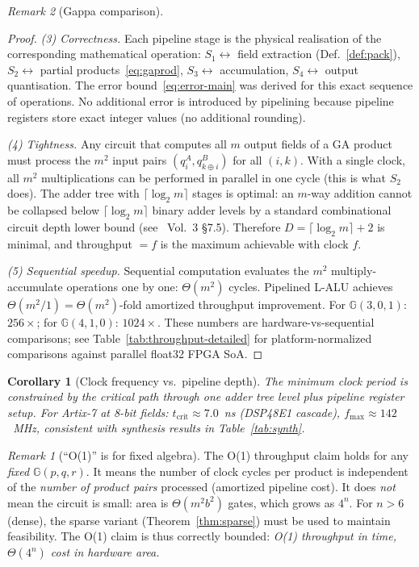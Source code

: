 \documentclass[11pt,a4paper]{article}
\theoremstyle{definition}
\theoremstyle{plain}
\newtheorem{corollary}{Corollary}[section]
\theoremstyle{remark}
\newtheorem{remark}{Remark}[section]
\newcommand{\GA}{\mathbb{G}}
\newcommand{\ceil}[1]{\lceil #1 \rceil}
\begin{document}
\begin{remark}[Gappa comparison]
\begin{proof}
\textit{(3) Correctness.}
Each pipeline stage is the physical realisation of the corresponding
mathematical operation:
$S_1 \leftrightarrow$ field extraction (Def.~\ref{def:pack}),
$S_2 \leftrightarrow$ partial products~\eqref{eq:gaprod},
$S_3 \leftrightarrow$ accumulation,
$S_4 \leftrightarrow$ output quantisation.
The error bound~\eqref{eq:error-main} was derived for this exact
sequence of operations.
No additional error is introduced by pipelining because pipeline
registers store exact integer values (no additional rounding).

\textit{(4) Tightness.}
Any circuit that computes all $m$ output fields of a GA product must
process the $m^2$ input pairs $(q_i^A, q_{k\oplus i}^B)$ for all
$(i,k)$.
With a single clock, all $m^2$ multiplications can be performed in
parallel in one cycle (this is what $S_2$ does).
The adder tree with $\ceil{\log_2 m}$ stages is optimal: an $m$-way
addition cannot be collapsed below $\ceil{\log_2 m}$ binary adder
levels by a standard combinational circuit depth lower bound
(see~\cite{knuth1998} Vol.~3 \S7.5).
Therefore $D = \ceil{\log_2 m}+2$ is minimal, and throughput $= f$
is the maximum achievable with clock $f$.

\textit{(5) Sequential speedup.}
Sequential computation evaluates the $m^2$ multiply-accumulate
operations one by one: $\Theta(m^2)$ cycles.
Pipelined L-ALU achieves $\Theta(m^2/1) = \Theta(m^2)$-fold amortized
throughput improvement.
For $\GA(3,0,1)$: $256\times$; for $\GA(4,1,0)$: $1024\times$.
These numbers are hardware-vs-sequential comparisons; see
Table~\ref{tab:throughput-detailed} for platform-normalized comparisons
against parallel float32 FPGA SoA.
\end{proof}

\begin{corollary}[Clock frequency vs.\ pipeline depth]\label{cor:fmax}
The minimum clock period is constrained by the critical path through
one adder tree level plus pipeline register setup.
For Artix-7 at 8-bit fields: $t_{\mathrm{crit}} \approx 7.0$~ns
(DSP48E1 cascade), $f_{\max} \approx 142$~MHz, consistent with
synthesis results in Table~\ref{tab:synth}.
\end{corollary}

\begin{remark}[``O(1)'' is for fixed algebra]\label{rem:o1}
The O(1) throughput claim holds for any \emph{fixed} $\GA(p,q,r)$.
It means the number of clock cycles per product is independent of the
\emph{number of product pairs} processed (amortized pipeline cost).
It does \emph{not} mean the circuit is small: area is $\Theta(m^2b^2)$
gates, which grows as $4^n$.
For $n > 6$ (dense), the sparse variant (Theorem~\ref{thm:sparse})
must be used to maintain feasibility.
The O(1) claim is thus correctly bounded:
\textit{O(1) throughput in time, $\Theta(4^n)$ cost in hardware area.}
\end{remark}


\end{remark}
\end{document}
